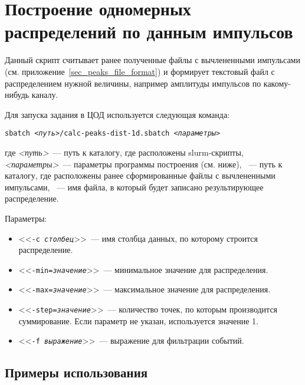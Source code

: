 \documentclass[12pt, a4paper, oneside, onecolumn]{book}
\newcommand{\COMMAND}[1]{{\tt #1}}
\newcommand{\CMDARG}[1]{<<{\tt #1}>>}
\begin{document}
\section{Построение одномерных распределений по данным импульсов}

Данный скрипт считывает ранее полученные файлы с вычлененными импульсами (см. приложение~\ref{sec_peaks_file_format}) и формирует текстовый файл с распределением нужной величины, например амплитуды импульсов по какому-нибудь каналу.

Для запуска задания в ЦОД используется следующая команда:

\bigskip

\COMMAND{sbatch {\it <путь>}/calc-peaks-dist-1d.sbatch {\it <параметры>} {\it <каталог с файлами импульсов>} {\it <имя результирующего файла>}
}

\bigskip

где {\it <путь>}~--- путь к каталогу, где расположены slurm-скрипты, {\it <параметры>}~--- параметры программы построения (см. ниже), {\it <каталог с файлами импульсов>}~--- путь к каталогу, где расположены ранее сформированные файлы с вычлененными импульсами, {\it <имя результирующего файла>}~--- имя файла, в который будет записано результирующее распределение.

Параметры:

\begin{itemize}

\item \CMDARG{-c {\it столбец}}~--- имя столбца данных, по которому строится распределение.

\item \CMDARG{-min={\it значение}}~--- минимальное значение для распределения.

\item \CMDARG{-max={\it значение}}~--- максимальное значение для распределения.

\item \CMDARG{-step={\it значение}}~--- количество точек, по которым производится суммирование. Если параметр не указан, используется значение 1.

\item \CMDARG{-f {\it выражение}}~--- выражение для фильтрации событий.

\end{itemize}

\subsection{Примеры использования}
\end{document}
